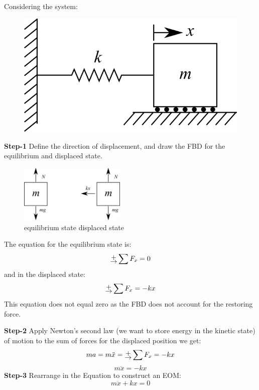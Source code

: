 \documentclass[12pt,letter]{article}
\begin{document}
					
		\begin{example}			
			
			Considering the system:
			\begin{figure}[H]
				\centering
				\includegraphics[]{../figures/1-DOF-spring_mass_horizontal.png}
			\end{figure}		
			
			\textbf{Step-1}
			Define the direction of displacement, and draw the FBD for the equilibrium and displaced state.  
			\begin{figure}[H]
				\centering
				\includegraphics[width=0.45\textwidth]{../figures/1-DOF-mass_horizontal_FBD.png}\\
				equilibrium state \hspace{3cm} displaced state
			\end{figure}		
			\noindent The equation for the equilibrium state is:
			\begin{equation}
			\rightplus \sum F_x = 0
			\end{equation}
			and in the displaced state:
			\begin{equation}
			\rightplus \sum F_x = -kx
			\end{equation}		
			This equation does not equal zero as the FBD does not account for the restoring force. 
	
			\noindent	\textbf{Step-2} Apply Newton's second law (we want to store energy in the kinetic state) of motion to the sum of forces for the displaced position we get: 		 		
			\begin{equation}
			ma = m\ddot{x} = \rightplus \sum F_x = -kx
			\end{equation}			
			\begin{equation}
			m\ddot{x} = -kx
			\end{equation}				
			\textbf{Step-3} Rearrange in the Equation to construct an EOM: 			
			\begin{equation}
			m\ddot{x} + kx = 0
			\end{equation}		
		\end{example}			
\end{document}
